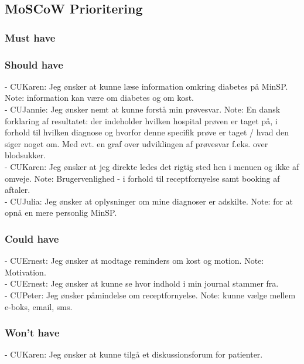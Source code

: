 \subsection{MoSCoW Prioritering}
\subsubsection{Must have}
\subsubsection{Should have}
%
- CUKaren: Jeg ønsker at kunne læse information omkring diabetes på MinSP. Note: information kan være om diabetes og om kost.\\ %
- CUJannie: Jeg ønsker nemt at kunne forstå min prøvesvar. Note: En dansk forklaring af resultatet: der indeholder hvilken hospital prøven er taget på, i forhold til hvilken diagnose og hvorfor denne specifik prøve er taget / hvad den siger noget om. Med evt. en graf over udviklingen af prøvesvar f.eks. over blodsukker.\\
- CUKaren: Jeg ønsker at jeg direkte ledes det rigtig sted hen i menuen og ikke af omveje. Note: Brugervenlighed - i forhold til receptfornyelse samt booking af aftaler.\\ 
- CUJulia: Jeg ønsker at oplysninger om mine diagnoser er adskilte. Note: for at opnå en mere personlig MinSP.\\
\subsubsection{Could have}
- CUErnest: Jeg ønsker at modtage reminders om kost og motion. Note: Motivation. \\
- CUErnest: Jeg ønsker at kunne se hvor indhold i min journal stammer fra.\\
- CUPeter: Jeg ønsker påmindelse om receptfornyelse. Note: kunne vælge mellem e-boks, email, sms.\\
\subsubsection{Won't have}
- CUKaren: Jeg ønsker at kunne tilgå et diskussionsforum for patienter.\\ %